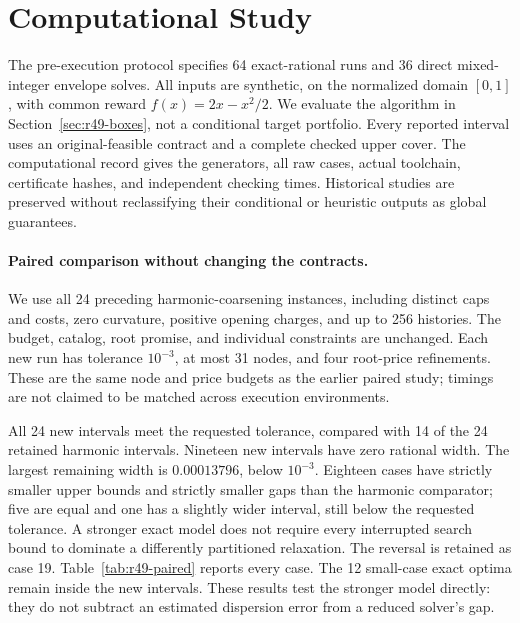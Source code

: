 \section{Computational Study}\label{sec:r49-study}
The pre-execution protocol specifies 64 exact-rational runs and 36 direct mixed-integer envelope solves. All inputs are synthetic, on the normalized domain $[0,1]$, with common reward $f(x)=2x-x^2/2$. We evaluate the algorithm in Section~\ref{sec:r49-boxes}, not a conditional target portfolio. Every reported interval uses an original-feasible contract and a complete checked upper cover. The computational record gives the generators, all raw cases, actual toolchain, certificate hashes, and independent checking times. Historical studies are preserved without reclassifying their conditional or heuristic outputs as global guarantees.

\paragraph{Paired comparison without changing the contracts.}
We use all 24 preceding harmonic-coarsening instances, including distinct caps and costs, zero curvature, positive opening charges, and up to 256 histories. The budget, catalog, root promise, and individual constraints are unchanged. Each new run has tolerance $10^{-3}$, at most 31 nodes, and four root-price refinements. These are the same node and price budgets as the earlier paired study; timings are not claimed to be matched across execution environments.

All 24 new intervals meet the requested tolerance, compared with 14 of the 24 retained harmonic intervals. Nineteen new intervals have zero rational width. The largest remaining width is $0.00013796$, below $10^{-3}$. Eighteen cases have strictly smaller upper bounds and strictly smaller gaps than the harmonic comparator; five are equal and one has a slightly wider interval, still below the requested tolerance. A stronger exact model does not require every interrupted search bound to dominate a differently partitioned relaxation. The reversal is retained as case 19. Table~\ref{tab:r49-paired} reports every case. The 12 small-case exact optima remain inside the new intervals. These results test the stronger model directly: they do not subtract an estimated dispersion error from a reduced solver's gap.

